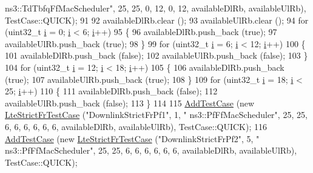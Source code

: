 \begin{DoxyCode}
{      ns3::TdTbfqFfMacScheduler"}, 25, 25, 0, 12, 0, 12, availableDlRb, availableUlRb), TestCase::QUICK);
91 
92   availableDlRb.clear ();
93   availableUlRb.clear ();
94   \textcolor{keywordflow}{for} (uint32\_t \hyperlink{bernuolliDistribution_8m_a6f6ccfcf58b31cb6412107d9d5281426}{i} = 0; \hyperlink{bernuolliDistribution_8m_a6f6ccfcf58b31cb6412107d9d5281426}{i} < 6; \hyperlink{bernuolliDistribution_8m_a6f6ccfcf58b31cb6412107d9d5281426}{i}++)
95     \{
96       availableDlRb.push\_back (\textcolor{keyword}{true});
97       availableUlRb.push\_back (\textcolor{keyword}{true});
98     \}
99   \textcolor{keywordflow}{for} (uint32\_t \hyperlink{bernuolliDistribution_8m_a6f6ccfcf58b31cb6412107d9d5281426}{i} = 6; \hyperlink{bernuolliDistribution_8m_a6f6ccfcf58b31cb6412107d9d5281426}{i} < 12; \hyperlink{bernuolliDistribution_8m_a6f6ccfcf58b31cb6412107d9d5281426}{i}++)
100     \{
101       availableDlRb.push\_back (\textcolor{keyword}{false});
102       availableUlRb.push\_back (\textcolor{keyword}{false});
103     \}
104   \textcolor{keywordflow}{for} (uint32\_t \hyperlink{bernuolliDistribution_8m_a6f6ccfcf58b31cb6412107d9d5281426}{i} = 12; \hyperlink{bernuolliDistribution_8m_a6f6ccfcf58b31cb6412107d9d5281426}{i} < 18; \hyperlink{bernuolliDistribution_8m_a6f6ccfcf58b31cb6412107d9d5281426}{i}++)
105     \{
106       availableDlRb.push\_back (\textcolor{keyword}{true});
107       availableUlRb.push\_back (\textcolor{keyword}{true});
108     \}
109   \textcolor{keywordflow}{for} (uint32\_t \hyperlink{bernuolliDistribution_8m_a6f6ccfcf58b31cb6412107d9d5281426}{i} = 18; \hyperlink{bernuolliDistribution_8m_a6f6ccfcf58b31cb6412107d9d5281426}{i} < 25; \hyperlink{bernuolliDistribution_8m_a6f6ccfcf58b31cb6412107d9d5281426}{i}++)
110     \{
111       availableDlRb.push\_back (\textcolor{keyword}{false});
112       availableUlRb.push\_back (\textcolor{keyword}{false});
113     \}
114 
115   \hyperlink{classns3_1_1TestCase_a3718088e3eefd5d6454569d2e0ddd835}{AddTestCase} (\textcolor{keyword}{new} \hyperlink{classLteStrictFrTestCase}{LteStrictFrTestCase} (\textcolor{stringliteral}{"DownlinkStrictFrPf1"}, 1, \textcolor{stringliteral}{"
      ns3::PfFfMacScheduler"}, 25, 25, 6, 6, 6, 6, 6, 6, availableDlRb, availableUlRb), TestCase::QUICK);
116   \hyperlink{classns3_1_1TestCase_a3718088e3eefd5d6454569d2e0ddd835}{AddTestCase} (\textcolor{keyword}{new} \hyperlink{classLteStrictFrTestCase}{LteStrictFrTestCase} (\textcolor{stringliteral}{"DownlinkStrictFrPf2"}, 5, \textcolor{stringliteral}{"
      ns3::PfFfMacScheduler"}, 25, 25, 6, 6, 6, 6, 6, 6, availableDlRb, availableUlRb), TestCase::QUICK);

\end{DoxyCode}
